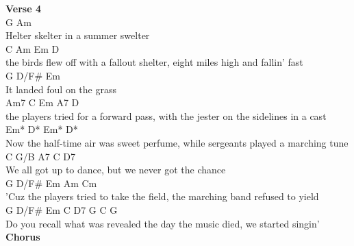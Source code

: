 \documentclass[a4paper]{article}
\begin{document}
{{        }
        \pagebreak
        \textbf{Verse 4}
        ~\\
        {
            \cutive
            \obeyspaces
G                   Am
\\
Helter skelter in a summer swelter
\\
C                      Am                 Em                     D
\\
the birds flew off with a fallout shelter, eight miles high and fallin' fast
\\
      G   D/F\#  Em
\\
It landed foul on the grass
\\
      Am7                C            Em                             A7     D
\\
the players tried for a forward pass, with the jester on the sidelines in a cast
\\
         Em*               D*                  Em*                 D*
\\
Now the half-time air was sweet perfume, while sergeants played a marching tune
\\
C          G/B      A7      C                  D7
\\
We all got up to dance, but we never got the chance
\\
          G      D/F\#      Em                 Am              Cm
\\
'Cuz the players tried to take the field, the marching band refused to yield
\\
    G    D/F\#       Em              C        D7       G  C  G
\\
Do you recall what was revealed the day the music died,    we started singin'
\\

        }
        \textbf{Chorus}
        ~\\
        {
            \cutive
            \obeyspaces

}}
\end{document}
